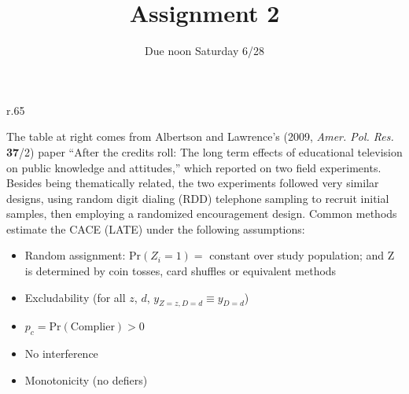 \documentclass{article}
\title{Assignment 2}
\author{Due noon Saturday 6/28}
\begin{document}
\maketitle

\begin{minipage}{1.0\linewidth}

\begin{wrapfigure}{r}{.65\linewidth}
\end{wrapfigure}

The table at right comes from Albertson and Lawrence's (2009, \textit{Amer. Pol. Res.} \textbf{37}/2) paper ``After the credits roll: The long term effects of educational television on public knowledge and attitudes,'' which reported on two field experiments. Besides being thematically related, the two experiments followed very similar designs, using random digit dialing (RDD) telephone sampling to recruit initial samples, then employing a randomized encouragement design.  Common methods estimate the CACE (LATE) under the following assumptions:

\begin{itemize}
\item Random assignment: $\mathrm{Pr}(Z_{i}=1) = $ constant over study population;  and $\mathrm{Z} $ is determined by coin tosses, card shuffles or equivalent methods
\item Excludability (for all $z$, $d$, $y_{Z=z, D=d} \equiv y_{D=d}$)
\item $p_{c} = \mathrm{Pr}(\mathrm{Complier}) > 0$
\item No interference
\item Monotonicity (no defiers)
\end{itemize}

\end{minipage}
\vspace{2ex}
\end{document}
